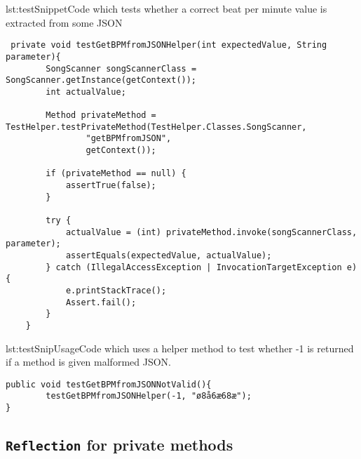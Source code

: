 \begin{code}{lst:testSnippet}{Code which tests whether a correct beat per minute value is extracted from some JSON}
\begin{lstlisting}
 private void testGetBPMfromJSONHelper(int expectedValue, String parameter){
        SongScanner songScannerClass = SongScanner.getInstance(getContext());
        int actualValue;

        Method privateMethod = TestHelper.testPrivateMethod(TestHelper.Classes.SongScanner,
                "getBPMfromJSON",
                getContext());

        if (privateMethod == null) {
            assertTrue(false);
        }

        try {
            actualValue = (int) privateMethod.invoke(songScannerClass, parameter);
            assertEquals(expectedValue, actualValue);
        } catch (IllegalAccessException | InvocationTargetException e) {
            e.printStackTrace();
            Assert.fail();
        }
    }
\end{lstlisting}
\end{code}
\begin{code}{lst:testSnipUsage}{Code which uses a helper method to test whether -1 is returned if a method is given malformed JSON.}
\begin{lstlisting}
public void testGetBPMfromJSONNotValid(){
        testGetBPMfromJSONHelper(-1, "ø8å6æ68æ");
}
\end{lstlisting}
\end{code}

\subsection{\texttt{Reflection} for private methods}\label{sec:privTest}
